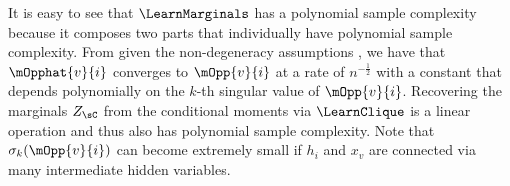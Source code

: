 It is easy to see that $\LearnMarginals$ has a polynomial sample complexity because it composes two parts that individually have polynomial sample complexity.
From \citet{anandkumar13tensor} given the non-degeneracy assumptions
  , we have that $\mOpphat{v}{i}$
  converges to $\mOpp{v}{i}$ at a rate of $n^{-\frac12}$ with a constant
  that depends polynomially on the $k$-th singular value of
  $\mOpp{v}{i}$.
Recovering the marginals $Z_\sC$ from the conditional moments via $\LearnClique$ is a linear operation and thus also has polynomial sample complexity. 
Note that $\sigma_{k}(\mOpp{v}{i})$ can become extremely
small if $h_i$ and $x_v$ are connected via many intermediate hidden variables.


